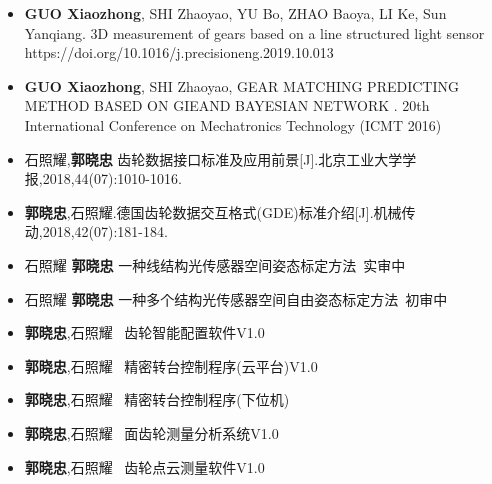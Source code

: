 %
%



\begin{itemize}
	\item \textbf{GUO Xiaozhong}, SHI Zhaoyao, YU Bo, ZHAO Baoya, LI Ke, Sun Yanqiang. 3D measurement of gears based on a line structured light sensor https://doi.org/10.1016/j.precisioneng.2019.10.013\\
	 { \footnotesize {}} 
	 \item \textbf{GUO Xiaozhong}, SHI Zhaoyao, GEAR MATCHING PREDICTING METHOD BASED ON GIEAND BAYESIAN NETWORK .	20th International Conference on Mechatronics Technology (ICMT 2016)\\
	 { \footnotesize {}}
	 \item 石照耀,\textbf{郭晓忠} 齿轮数据接口标准及应用前景[J].北京工业大学学报,2018,44(07):1010-1016.	\\
	 { \footnotesize {}}
	\item \textbf{郭晓忠},石照耀.德国齿轮数据交互格式(GDE)标准介绍[J].机械传动,2018,42(07):181-184.\\
	 { \footnotesize {}}
	\item 石照耀 \textbf{郭晓忠}  一种线结构光传感器空间姿态标定方法\ 实审中\\
	 { \footnotesize {}}
	 \item 石照耀 \textbf{郭晓忠}  一种多个结构光传感器空间自由姿态标定方法\ 初审中\\
	 { \footnotesize {}}
	 \item \textbf{郭晓忠},石照耀 \ 齿轮智能配置软件V1.0 \\
	 { \footnotesize {}}
	\item \textbf{郭晓忠},石照耀 \ 精密转台控制程序(云平台)V1.0 \\
	 { \footnotesize {}}
	\item \textbf{郭晓忠},石照耀 \ 精密转台控制程序(下位机) \\
	 { \footnotesize {}}
	\item \textbf{郭晓忠},石照耀  \ 面齿轮测量分析系统V1.0 \\
	 { \footnotesize {}}
	\item \textbf{郭晓忠},石照耀 \  齿轮点云测量软件V1.0 \\
	 { \footnotesize {}}
\end{itemize}